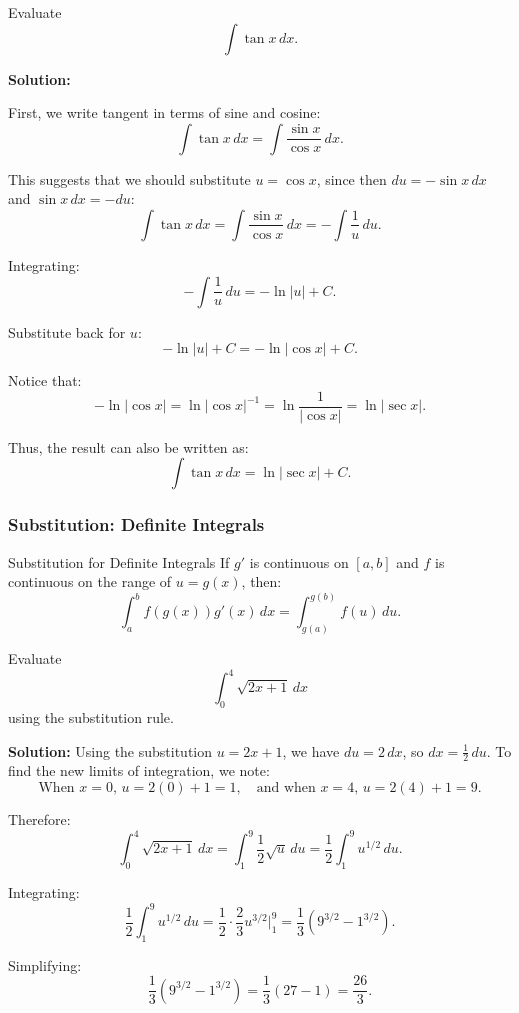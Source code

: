 \documentclass[12pt]{article}
\theoremstyle{beautifulthm}
\begin{document}
\begin{tcolorbox}[colback=examplebg, colframe=red!75!black, title=\textbf{EXAMPLE 4: Find the Integral of the Function}, fonttitle=\bfseries, sharp corners]
Evaluate 
\[
\int \tan x \, dx.
\]


\tcblower
\textbf{Solution:} 

First, we write tangent in terms of sine and cosine:
\[
\int \tan x \, dx = \int \frac{\sin x}{\cos x} \, dx.
\]

This suggests that we should substitute $u = \cos x$, since then $du = -\sin x \, dx$ and $\sin x \, dx = -du$:
\[
\int \tan x \, dx = \int \frac{\sin x}{\cos x} \, dx = -\int \frac{1}{u} \, du.
\]

Integrating:
\[
-\int \frac{1}{u} \, du = -\ln |u| + C.
\]

Substitute back for $u$:
\[
-\ln |u| + C = -\ln |\cos x| + C.
\]

Notice that:
\[
-\ln |\cos x| = \ln |\cos x|^{-1} = \ln \frac{1}{|\cos x|} = \ln |\sec x|.
\]

Thus, the result can also be written as:
\[
\int \tan x \, dx = \ln |\sec x| + C.
\]




\end{tcolorbox}



\subsubsection{Substitution: Definite Integrals}
\begin{mytheorem}{Substitution for Definite Integrals}
    If $g'$ is continuous on $[a, b]$ and $f$ is continuous on the range of $u = g(x)$, then:
\[
\int_a^b f(g(x)) g'(x) \, dx = \int_{g(a)}^{g(b)} f(u) \, du.
\]
\end{mytheorem}
\begin{tcolorbox}[colback=examplebg, colframe=red!75!black, title=\textbf{EXAMPLE 5: Changing the Limits of Integration}, fonttitle=\bfseries, sharp corners]
Evaluate 
\[
\int_0^4 \sqrt{2x + 1} \, dx
\]
using the substitution rule.


\tcblower
\textbf{Solution:} 
Using the substitution $u = 2x + 1$, we have $du = 2 \, dx$, so $dx = \frac{1}{2} \, du$. To find the new limits of integration, we note:
\[
\text{When } x = 0, \, u = 2(0) + 1 = 1, \quad \text{and when } x = 4, \, u = 2(4) + 1 = 9.
\]

Therefore:
\[
\int_0^4 \sqrt{2x + 1} \, dx = \int_1^9 \frac{1}{2} \sqrt{u} \, du = \frac{1}{2} \int_1^9 u^{1/2} \, du.
\]

Integrating:
\[
\frac{1}{2} \int_1^9 u^{1/2} \, du = \frac{1}{2} \cdot \frac{2}{3} u^{3/2} \Big|_1^9 = \frac{1}{3} \left( 9^{3/2} - 1^{3/2} \right).
\]

Simplifying:
\[
\frac{1}{3} \left( 9^{3/2} - 1^{3/2} \right) = \frac{1}{3} \left( 27 - 1 \right) = \frac{26}{3}.
\]




\end{tcolorbox}
\end{document}
